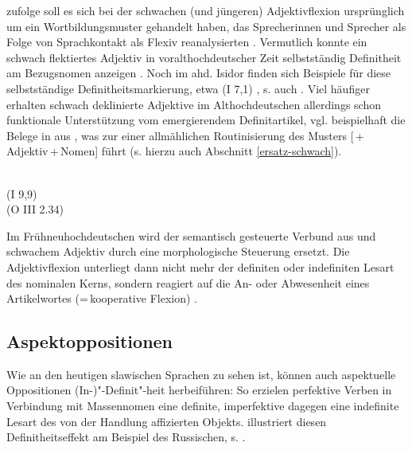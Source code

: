 

\textcite[361ff.]{Braunmuller2008} zufolge soll es sich bei der schwachen (und jüngeren) Adjektivflexion ursprünglich um ein Wortbildungsmuster gehandelt haben, das Sprecherinnen und Sprecher als Folge von Sprachkontakt als Flexiv reanalysierten \parencite[zu alternativen Entstehungsszenarien s.][13--26]{Kovari1984}. Vermutlich konnte ein schwach flektiertes Adjektiv in voralthochdeutscher Zeit selbstständig Definitheit am Bezugsnomen anzeigen 
\parencites()()[69]{Demske2001}[364]{Braunmuller2008}. Noch im ahd. Isidor finden sich Beispiele für diese selbstständige Definitheitsmarkierung, etwa   (I 7,1) \parencite[226]{Braune2004}, s. auch \textcite[69f.]{Demske2001}. 
Viel häufiger erhalten schwach deklinierte Adjektive im Althochdeutschen allerdings schon funktionale Unterstützung vom emergierendem Definitartikel, vgl. beispielhaft die Belege in  aus \textcite[24,28]{Schrodt2004}, was zur einer allmählichen Routinisierung des Musters [\,+\,Adjektiv\,+\,Nomen] führt (s. hierzu auch Abschnitt \ref{ersatz-schwach}).

\begin{exe}
	\ex \label{ex:art-adj}   
	\begin{xlist}
		\ex \label{ex:art-adj1}  \\    (I 9,9) 
		\ex \label{ex:art-adj2}   \\  (O III 2.34)
		\end{xlist}
\end{exe}
 
Im Frühneuhochdeutschen wird der semantisch gesteuerte Verbund aus  und schwachem Adjektiv durch eine morphologische Steuerung ersetzt. Die Adjektivflexion unterliegt dann nicht mehr der definiten oder indefiniten Lesart des nominalen Kerns, sondern reagiert auf die An- oder Abwesenheit eines Artikelwortes (=\,kooperative Flexion) \parencite[s. hierzu ausführlich][]{Demske2001,Szczepaniak2011a}. 

\subsection{Aspektoppositionen} \label{sec:aspektoppo}

Wie an den heutigen slawischen Sprachen zu sehen ist, können auch aspektuelle Oppositionen (In-)"-Definit"-heit herbeiführen: So erzielen perfektive Verben in Verbindung mit Massennomen eine definite, imperfektive dagegen eine indefinite Lesart des von der Handlung affizierten Objekts. \textcite[11ff.]{Leiss2000} illustriert diesen Definitheitseffekt am Beispiel des Russischen, s. .  

